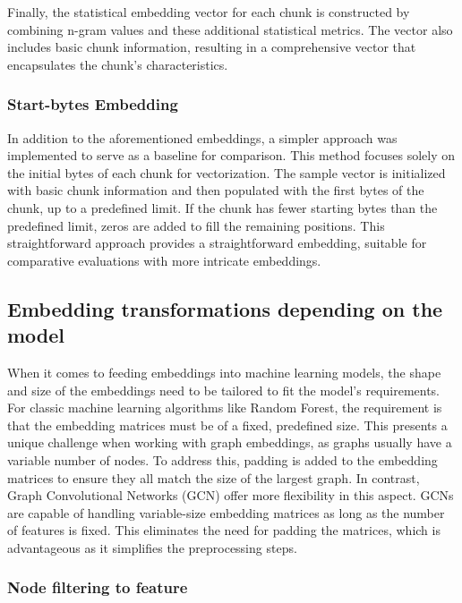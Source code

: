 Finally, the statistical embedding vector for each chunk is constructed by combining n-gram values and these additional statistical metrics. The vector also includes basic chunk information, resulting in a comprehensive vector that encapsulates the chunk's characteristics.

\subsubsection{Start-bytes Embedding}
In addition to the aforementioned embeddings, a simpler approach was implemented to serve as a baseline for comparison. This method focuses solely on the initial bytes of each chunk for vectorization. The sample vector is initialized with basic chunk information and then populated with the first bytes of the chunk, up to a predefined limit. If the chunk has fewer starting bytes than the predefined limit, zeros are added to fill the remaining positions. This straightforward approach provides a straightforward embedding, suitable for comparative evaluations with more intricate embeddings.

\subsection{Embedding transformations depending on the model}

When it comes to feeding embeddings into machine learning models, the shape and size of the embeddings need to be tailored to fit the model's requirements. For classic machine learning algorithms like Random Forest, the requirement is that the embedding matrices must be of a fixed, predefined size. This presents a unique challenge when working with graph embeddings, as graphs usually have a variable number of nodes. To address this, padding is added to the embedding matrices to ensure they all match the size of the largest graph. In contrast, Graph Convolutional Networks (GCN) offer more flexibility in this aspect. GCNs are capable of handling variable-size embedding matrices as long as the number of features is fixed. This eliminates the need for padding the matrices, which is advantageous as it simplifies the preprocessing steps.

\subsubsection{Node filtering to feature}

